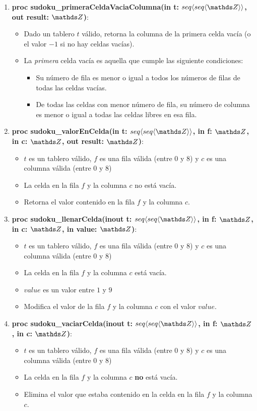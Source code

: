 \documentclass[spanish,a4paper]{article}
\begin{document}
\begin{enumerate}
\item \textbf{proc sudoku\_primeraCeldaVaciaColumna(in t: $\TLista{\TLista{\ent}}$, out result: $\ent$)}:
\begin{itemize}
\item Dado un tablero $t$ v\'alido, retorna la columna de la primera celda vac\'ia (o el valor $-1$ si no hay celdas vac\'ias).
\item La \emph{primera} celda vac\'ia es aquella que cumple las siguiente condiciones:
	\begin{itemize}
	\item Su n\'umero de fila es menor o igual a todos los n\'umeros de filas de todas las celdas vac\'ias.
	\item De todas las celdas con menor n\'umero de fila, su n\'umero de columna es menor o igual a todas las celdas libres en esa fila.
	\end{itemize}  
\end{itemize}

\item \textbf{proc sudoku\_valorEnCelda(in t: $\TLista{\TLista{\ent}}$, in f: $\ent$, in c: $\ent$, out result: $\ent$)}:
\begin{itemize}
\item $t$ es un tablero v\'alido, $f$ es una fila v\'alida (entre 0 y 8) y $c$ es una columna v\'alida (entre 0 y 8)
\item La celda en la fila $f$ y la columna $c$ no est\'a vac\'ia.
\item Retorna el valor contenido en la fila $f$ y la columna $c$.
\end{itemize}

\item \textbf{proc sudoku\_llenarCelda(inout t: $\TLista{\TLista{\ent}}$, in f: $\ent$, in c: $\ent$, in value: $\ent$)}:
\begin{itemize}
\item $t$ es un tablero v\'alido, $f$ es una fila v\'alida (entre 0 y 8) y $c$ es una columna v\'alida (entre 0 y 8)
\item La celda en la fila $f$ y la columna $c$ est\'a vac\'ia.
\item $value$ es un valor entre $1$ y $9$
\item Modifica el valor de la fila $f$ y la columna $c$ con el valor $value$.
\end{itemize}

\item \textbf{proc sudoku\_vaciarCelda(inout t: $\TLista{\TLista{\ent}}$, in f: $\ent$, in c: $\ent$)}:
\begin{itemize}
\item $t$ es un tablero v\'alido, $f$ es una fila v\'alida (entre 0 y 8) y $c$ es una columna v\'alida (entre 0 y 8)
\item La celda en la fila $f$ y la columna $c$ \textbf{no}  est\'a vac\'ia.
\item Elimina el valor que estaba contenido en la celda en la fila $f$ y la columna $c$.
\end{itemize}




\end{enumerate}
\end{document}
